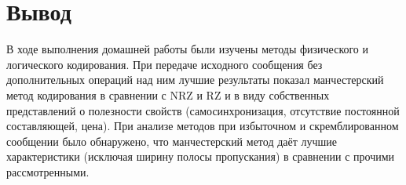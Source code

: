 \documentclass[12pt, a4paper] {ncc}
\begin{document}
\section*{Вывод}

	В ходе выполнения домашней работы были изучены методы физического и логического кодирования.
	При передаче исходного сообщения без дополнительных операций над ним лучшие результаты показал
	манчестерский метод кодирования в сравнении с NRZ и RZ и в виду собственных представлений о
	полезности свойств (самосинхронизация, отсутствие постоянной составляющей, цена). 
	При анализе методов при избыточном и скремблированном сообщении было обнаружено, что манчестерский
	метод даёт лучшие характеристики (исключая ширину полосы пропускания) в сравнении с прочими
    рассмотренными. 
\end{document}
